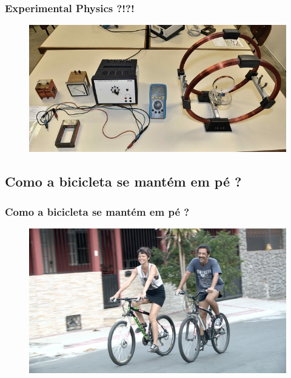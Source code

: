 \documentclass{beamer}
\begin{document}
	\begin{frame}
		\frametitle{Experimental Physics ?!?!}
		\begin{figure}[h]
			\centering
			\includegraphics[scale=2]{experimental.jpg}
		\end{figure}
	\end{frame}
	\begin{frame}
		\section{Como a bicicleta se mantém em pé ?}
		\frametitle{Como a bicicleta se mantém em pé ?}
		\begin{figure}[h]
			\centering
			\includegraphics[scale=0.13]{bike.png}
		\end{figure}
	\end{frame}
\end{document}

